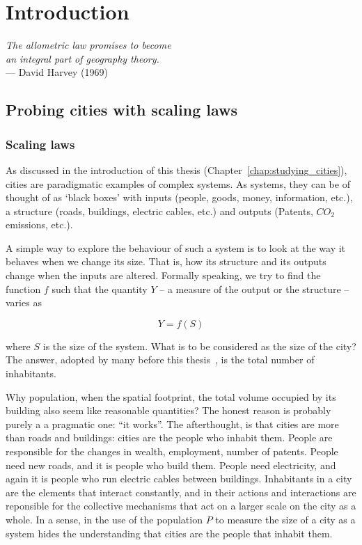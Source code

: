 \chapter{Introduction}
\label{chap:scaling_introduction}

\begin{flushright}{\slshape    
The allometric law promises to become\\
an integral part of geography theory.} \\ \medskip
--- David Harvey (1969)~\cite{Harvey:1969} 
\end{flushright}


\section{Probing cities with scaling laws}
\label{sec:probing_cities_with_scaling_laws}

\subsection{Scaling laws}
\label{sub:scaling_laws}

As discussed in the introduction of this thesis
(Chapter~\ref{chap:studying_cities}), cities are paradigmatic examples of
complex systems. As systems, they can be of thought of as `black boxes'
with inputs (people, goods, money, information, etc.), a structure (roads,
buildings, electric cables, etc.) and outputs (Patents, $CO_2$ emissions, etc.).

A simple way to explore the behaviour of such a system is to look at the way it
 behaves when we change its size. That is, how its structure and its
outputs change when the inputs are altered. Formally speaking, we try to find
the function $f$ such that the quantity $Y$ -- a measure of the output or the
structure -- varies as

\begin{equation}
    Y = f(S)
    \label{eq:functional_form}
\end{equation}

where $S$ is the size of the system. What is to be considered as the size of the
city? The answer, adopted by many before this thesis~\cite{Stewart:1947,
Bettencourt:2007}, is the total number of inhabitants. 

Why population, when the spatial footprint, the total volume occupied by its
building also seem like reasonable quantities? The honest reason is probably
purely a a pragmatic one: ``it works''. The afterthought, is that cities are
more than roads and buildings: cities are the people who inhabit them. People
are responsible for the changes in wealth, employment, number of patents. People
need new roads, and it is people who build them. People need electricity, and
again it is people who run electric cables between buildings. Inhabitants in a
city are the elements that interact constantly, and in their actions and
interactions are reponsible for the collective mechanisms that act on a larger
scale on the city as a whole.  In a sense, in the use of the population $P$ to
measure the size of a city as a system hides the understanding that cities are
the people that inhabit them.\\

